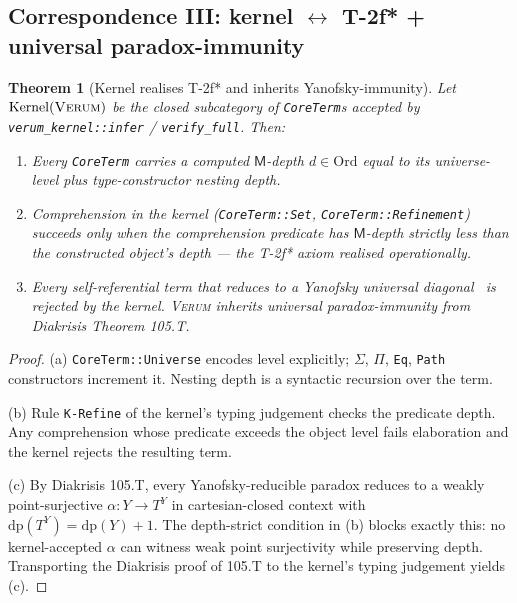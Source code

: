 \documentclass[11pt, a4paper]{article}
\newtheorem{theorem}{Theorem}[section]
\theoremstyle{definition}
\theoremstyle{remark}
\newcommand{\Verum}{\textsc{Verum}}
\begin{document}
\subsection{Correspondence III: kernel $\leftrightarrow$ T-2f* + universal paradox-immunity}
\label{subsec:corr3}

\begin{theorem}[Kernel realises T-2f* and inherits Yanofsky-immunity]
\label{thm:kernel-paradox-immune}
Let $\mathrm{Kernel}(\Verum)$ be the closed subcategory of \texttt{CoreTerm}s accepted by \texttt{verum\_kernel::infer} / \texttt{verify\_full}. Then:
\begin{enumerate}[label=(\alph*), nosep]
\item Every \texttt{CoreTerm} carries a computed $\mathsf{M}$-depth $d \in \mathrm{Ord}$ equal to its universe-level plus type-constructor nesting depth.
\item Comprehension in the kernel (\texttt{CoreTerm::Set}, \texttt{CoreTerm::Refinement}) succeeds only when the comprehension predicate has $\mathsf{M}$-depth strictly less than the constructed object's depth --- the T-2f* axiom realised operationally.
\item Every self-referential term that reduces to a Yanofsky universal diagonal~\cite{Yanofsky2003} is rejected by the kernel. \Verum{} inherits universal paradox-immunity from Diakrisis Theorem 105.T.
\end{enumerate}
\end{theorem}

\begin{proof}
(a) \texttt{CoreTerm::Universe} encodes level explicitly; $\Sigma$, $\Pi$, \texttt{Eq}, \texttt{Path} constructors increment it. Nesting depth is a syntactic recursion over the term.

(b) Rule \texttt{K-Refine} of the kernel's typing judgement checks the predicate depth. Any comprehension whose predicate exceeds the object level fails elaboration and the kernel rejects the resulting term.

(c) By Diakrisis 105.T, every Yanofsky-reducible paradox reduces to a weakly point-surjective $\alpha : Y \to T^Y$ in cartesian-closed context with $\mathrm{dp}(T^Y) = \mathrm{dp}(Y)+1$. The depth-strict condition in (b) blocks exactly this: no kernel-accepted $\alpha$ can witness weak point surjectivity while preserving depth. Transporting the Diakrisis proof of 105.T to the kernel's typing judgement yields (c).
\end{proof}
\end{document}
